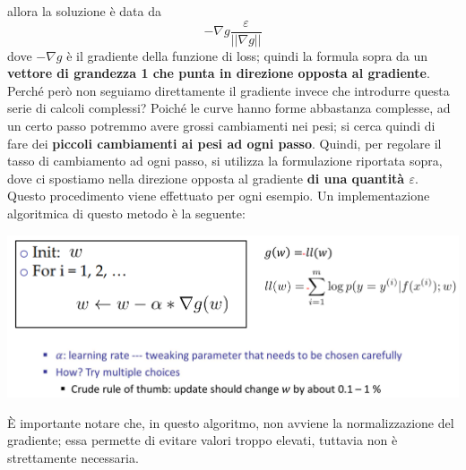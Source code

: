 \documentclass[12pt]{article}
\begin{document}
allora la soluzione è data da
$$-\nabla g \frac{\varepsilon}{||\nabla g||}$$
dove $-\nabla g$ è il gradiente della funzione di loss; quindi la formula sopra da un \textbf{vettore di grandezza 1 che punta in direzione opposta al gradiente}.
Perché però non seguiamo direttamente il gradiente invece che introdurre questa serie di calcoli complessi? Poiché le curve hanno forme abbastanza complesse,
ad un certo passo potremmo avere grossi cambiamenti nei pesi; si cerca quindi di fare dei \textbf{piccoli cambiamenti ai pesi ad ogni passo}. Quindi, per regolare il tasso di cambiamento ad ogni passo,
si utilizza la formulazione riportata sopra, dove ci spostiamo nella direzione opposta al gradiente \textbf{di una quantità $\varepsilon$}.
Questo procedimento viene effettuato per ogni esempio.
Un implementazione algoritmica di questo metodo è la seguente:
\begin{center}
    \includegraphics[width =1\linewidth]{Images/118.PNG}
\end{center}
È importante notare che, in questo algoritmo, non avviene la normalizzazione del gradiente; essa permette di evitare valori troppo elevati, tuttavia non è strettamente necessaria.
\end{document}
